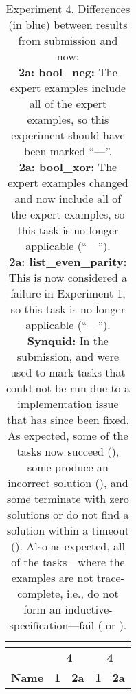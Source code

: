 \begin{table}

\experimentTableSize

\begin{tabular}{l|cccc}
& \multicolumn{2}{c}{\textbf{\leon{}}}
& \multicolumn{2}{c}{\textbf{\synquid{}}} \\\hline
& \multicolumn{2}{c}{\textbf{4}}
& \multicolumn{2}{c}{\textbf{4}} \\\hline
\textbf{Name} &
\textbf{1} & \textbf{2a} &
\textbf{1} & \textbf{2a} \\

\end{tabular}

\vspace{0.10in}

\caption{Experiment 4.
%
Differences (in blue) between results from submission and now:
%
\experimentCaptionSize
%
\\[3pt]
%
\textbf{2a: bool\_neg:} The \snsMyth{} expert examples include all of the
\myth{} expert examples, so this experiment should have been marked ``---''.
%
\\[3pt]
%
\textbf{2a: bool\_xor:} The \snsMyth{} expert examples changed and now include
all of the \myth{} expert examples, so this task is no longer applicable
(``---'').
%
\\[3pt]
%
\textbf{2a: list\_even\_parity:} This is now considered a failure in Experiment
1, so this task is no longer applicable (``---'').
%
\\[3pt]
%
\textbf{Synquid:} In the submission, \synquidDatatypeAxioms{} and
\synquidNotTraceComplete{} were used to mark tasks that could not be run due to
a \synquid{} implementation issue that has since been fixed. As expected, some
of the \synquidDatatypeAxioms{} tasks now succeed (\leonquidCorrectNoPhantom{}),
some produce an incorrect solution (\leonquidIncorrect{}), and some terminate
with zero solutions or do not find a solution within a timeout
(\leonquidError{}). Also as expected, all of the \synquidNotTraceComplete{}
tasks---where the examples are not trace-complete, i.e., do not form an
inductive- specification---fail (\leonquidIncorrect{} or \leonquidError{}).
%
}

\end{table}
